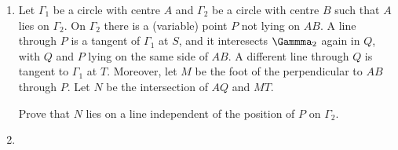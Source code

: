\documentclass[12pt]{article}
\begin{document}
\begin{enumerate}
\item %
Let $\Gamma_1$ be a circle with centre $A$ and $\Gamma_2$ be a circle with centre $B$ such that $A$ lies on $\Gamma_2$. On $\Gamma_2$ there is a (variable) point $P$ not lying on $AB$. A line through $P$ is a tangent of $\Gamma_1$ at $S$, and it interesects $\Gammma_2$ again in $Q$, with $Q$ and $P$ lying on the same side of $AB$. A different line through $Q$ is tangent to $\Gamma_1$ at $T$. Moreover, let $M$ be the foot of the perpendicular to $AB$ through $P$. Let $N$ be the intersection of $AQ$ and $MT$.

Prove that $N$ lies on a line independent of the position of $P$ on $\Gamma_2$.

\item %


\end{enumerate}

\vfill

\centering
\begin{BVerbatim}
\end{BVerbatim}
\end{document}
